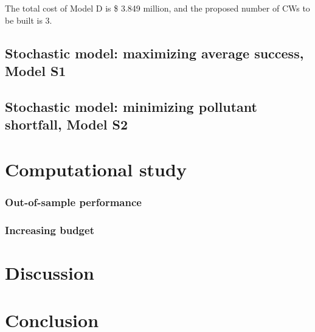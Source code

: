 \documentclass[preprint,12pt,authoryear]{elsarticle}
\begin{document}
The total cost of Model D is \$ 3.849 million, and the proposed number of CWs to be built is 3.


\subsection{Stochastic model: maximizing average success, Model S1}

\subsection{Stochastic model: minimizing pollutant shortfall, Model S2}


\section{Computational study}
\subsubsection{Out-of-sample performance}
\subsubsection{Increasing budget}

\section{Discussion}

\section{Conclusion}
\end{document}
